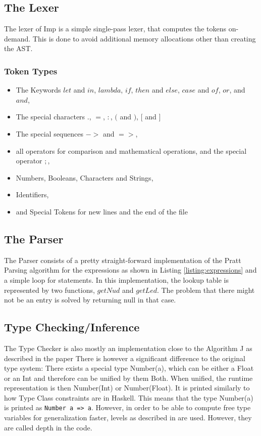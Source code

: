 \documentclass[12pt]{article}
\newcommand{\importListing}[1]{
    \begin{minipage}{\linewidth}
    
    \end{minipage}
}
\begin{document}
\subsection{The Lexer}
The lexer of Imp is a simple single-pass lexer, that computes
the tokens on-demand. This is done to avoid additional memory
allocations other than creating the AST.

\subsubsection{Token Types}
\begin{itemize}
	\item The Keywords $let$ and $in$, $lambda$, $if$, $then$ and $else$,
	      $case$ and $of$, $or$, and $and$,
	\item The special characters $.$, $=$, $:$, $($ and $)$, $[$ and $]$
	\item The special sequences $->$ and $=>$,
	\item all operators for comparison and mathematical operations,
	      and the special operator $;$,
	\item Numbers, Booleans, Characters and Strings,
	\item Identifiers,
	\item and Special Tokens for new lines and the end of the file
\end{itemize}

\subsection{The Parser}
\importListing{code/expressions.tex}

The Parser consists of a pretty straight-forward implementation of the Pratt Parsing algorithm
for the expressions as shown in Listing \ref{listing:expressions} and a simple loop for statements.
In this implementation, the lookup table is represented by two functions,
$getNud$ and $getLed$.
The problem that there might not be an entry is solved by returning null
in that case.

\subsection{Type Checking/Inference}
The Type Checker is also mostly an implementation close to the Algorithm J as described
in the paper \autocite{damasPrincipalTypeschemesFunctional1982}
There is however a significant difference to the original type system:
There exists a special type Number(a), which can be either a Float or an Int
and therefore can be unified by them Both. When unified, the runtime representation
is then Number(Int) or Number(Float).
It is printed similarly to how Type Class constraints are in Haskell.
This means that the type Number(a) is printed as \texttt{Number a => a}.
However, in order to be able to compute free type variables for generalization
faster, levels as described in \autocite{EfficientInsightfulGeneralization2022} are
used. However, they are called depth in the code.
\end{document}
